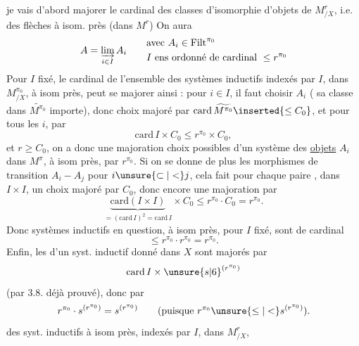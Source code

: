 je vais d'abord majorer le cardinal des classes d'isomorphie d'objets de $M^r_{/X}$, i.e. des  flèches à isom. près (dans $M^r$)
On aura
\[
A=\varinjlim_{i\in I}A_i\qquad
\begin{aligned}
&\text{avec }A_i\in\mathrm{Filt}^{\pi_0}\\
&I\text{ ens ordonné de cardinal }\le r^{\pi_0}
\end{aligned}
\]
Pour $I$ fixé, le  cardinal de l'ensemble des systèmes inductifs indexés par $I$, dans $M^{\pi_0}_{/X}$,  à isom près, peut se majorer ainsi : pour  $i\in I$, il faut choisir $A_i$  (  sa classe dans $\widetilde{M^{\pi_0}}$ importe), donc choix majoré par  $\mathrm{card}\,\widetilde{M^{\pi_0}}\inserted{\le C_0}$, et pour tous les $i$, par
\[
\mathrm{card}\,I\times C_0\le r^{\pi_0}\times C_0,
\]
et   $r\ge C_0$,  on a donc une majoration  choix possibles d'un système des \uline{objets} $A_i$  dans $M^\pi$, à isom près, par $r^{\pi_0}$.
Si on se donne de plus les morphismes de transition $A_i\mathbin{-}A_j$ pour $i\unsure{\subset|<}j$, cela fait pour chaque paire ,  dans $I\times I$, un choix majoré par $C_0$, donc encore une majoration par
\[
\underbrace{\mathrm{card}(I\times I)}_{=(\mathrm{card}\,I)^2=\mathrm{card}\,I}\times C_0\le r^{\pi_0}\cdot C_0=r^{\pi_0}.
\]
Donc   systèmes inductifs en question, à isom près, pour $I$ fixé, sont de cardinal
\[
\le r^{\pi_0}\cdot r^{\pi_0}=r^{\pi_0}.
\]
Enfin, les \uline{} d'un syst. inductif donné dans $X$ sont majorés par
\[
\mathrm{card}\,I\times\unsure{s|6}^{(r^{\pi_0})}
\]
(par 3.8. déjà prouvé), donc par
\[
r^{\pi_0}\cdot s^{(r^{\pi_0})}=s^{(r^{\pi_0})}\qquad(\text{puisque }r^{\pi_0}\unsure{\le|<}s^{(r^{\pi_0})}).
\]
   des syst. inductifs à isom près, indexés par $I$,  dans $M^r_{/X}$,  
